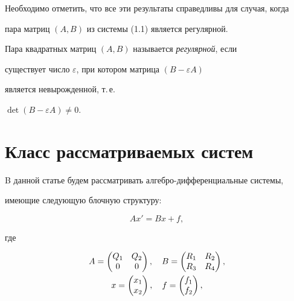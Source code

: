  


Необходимо отметить, что все эти результаты справедливы для случая, когда 


пара матриц $(A,B)$ из системы (1.1) является регулярной. 


 


\begin{defnnonum} 


Пара квадратных матриц $(A,B)$ называется {\it регулярной}, если 


существует число $\varepsilon$, при котором матрица $(B-\varepsilon A)$ 


является невырожденной, т.\,е. 


$\det(B-\varepsilon A)\ne0$. 


\end{defnnonum} 


 


 


\section{Класс рассматриваемых систем} 


 


B данной статье будем рассматривать алгебро-дифференциальные системы, 


имеющие следующую блочную структуру: 


\begin{equation} 


Ax'=Bx+f, 


\end{equation} 


где 


\begin{gather} 


A=\begin{pmatrix} Q_1 & Q_2 \\ 0 & 0 \end{pmatrix} 


,\quad B=\begin{pmatrix}R_1 & R_2 \\ R_3 & R_4 \end{pmatrix},\\ 


x=\begin{pmatrix} x_1 \\ x_2 \end{pmatrix} 


,\quad f=\begin{pmatrix} f_1 \\ f_2\end{pmatrix},\notag 


\end{gather} 


